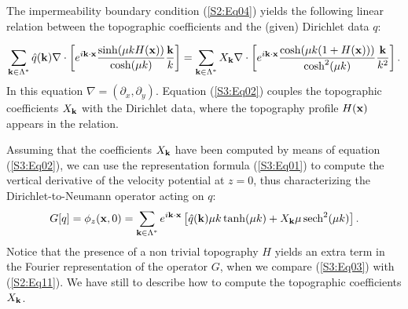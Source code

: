 The impermeability boundary condition (\ref{S2:Eq04}) yields the following linear relation between the 
topographic coefficients and the (given) Dirichlet data $q$:

\begin{equation}\label{S3:Eq02}
\sum_{\bold{k}\in\Lambda^*} \hat{q}(\bold{k})\nabla \cdot \left[ e^{i\bold{k}\cdot\bold{x}} \frac{\sinh(\mu k H(\bold{x}))}{\cosh(\mu k)}\frac{\bold{k}}{k}\right] = \sum_{\bold{k}\in\Lambda^*} X_{\bold{k}}\nabla\cdot \left[ e^{i\bold{k}\cdot\bold{x}} \frac{\cosh(\mu k(1+H(\bold{x})))}{\cosh^2(\mu k)}\frac{\bold{k}}{k^2}\right].
\end{equation}
In this equation $\nabla = (\partial_x,\partial_y)$. Equation (\ref{S3:Eq02}) couples the topographic 
coefficients $X_{\bold{k}}$ with the Dirichlet data, where  the topography profile $H(\bold{x})$ appears in the relation.

Assuming that the coefficients  $X_{\bold{k}}$ have been computed by means of equation (\ref{S3:Eq02}), we can use the representation formula (\ref{S3:Eq01}) to compute the vertical derivative of the velocity potential at $z=0$, 
thus characterizing the Dirichlet-to-Neumann operator acting on $q$:
\begin{equation}\label{S3:Eq03}
G[q] = \phi_z(\bold{x},0) = \sum_{\bold{k}\in\Lambda^*}e^{i\bold{k}\cdot\bold{x}}\left[\hat{q}(\bold{k})\mu k\tanh(\mu k) + X_{\bold{k}}\mu\operatorname{sech}^2(\mu k)\right].
\end{equation}
Notice that the presence of a non trivial topography $H$ yields an extra term in the Fourier representation of the operator $G$, 
when we compare (\ref{S3:Eq03}) with (\ref{S2:Eq11}).  We have still to describe how to compute the topographic coefficients
 $X_{\bold{k}}$.


